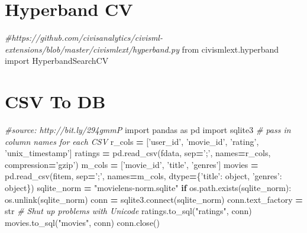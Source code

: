 \documentclass[]{book}
\newenvironment{Shaded}{\begin{snugshade}}{\end{snugshade}}
\newcommand{\StringTok}[1]{\textcolor[rgb]{0.31,0.60,0.02}{#1}}
\newcommand{\ImportTok}[1]{#1}
\newcommand{\CommentTok}[1]{\textcolor[rgb]{0.56,0.35,0.01}{\textit{#1}}}
\newcommand{\ControlFlowTok}[1]{\textcolor[rgb]{0.13,0.29,0.53}{\textbf{#1}}}
\newcommand{\OperatorTok}[1]{\textcolor[rgb]{0.81,0.36,0.00}{\textbf{#1}}}
\newcommand{\BuiltInTok}[1]{#1}
\newcommand{\ExtensionTok}[1]{#1}
\newcommand{\NormalTok}[1]{#1}
\begin{document}
\section{Hyperband CV}\label{hyperband-cv}

\begin{Shaded}
\begin{Highlighting}[]
\CommentTok{#https://github.com/civisanalytics/civisml-extensions/blob/master/civismlext/hyperband.py}
\ImportTok{from}\NormalTok{ civismlext.hyperband }\ImportTok{import}\NormalTok{ HyperbandSearchCV}
\end{Highlighting}
\end{Shaded}

\section{CSV To DB}\label{csv-to-db}

\begin{Shaded}
\begin{Highlighting}[]
\CommentTok{#source: http://bit.ly/294gmmP}
\ImportTok{import}\NormalTok{ pandas }\ImportTok{as}\NormalTok{ pd}
\ImportTok{import}\NormalTok{ sqlite3}
\CommentTok{# pass in column names for each CSV}
\NormalTok{r_cols }\OperatorTok{=}\NormalTok{ [}\StringTok{'user_id'}\NormalTok{, }\StringTok{'movie_id'}\NormalTok{, }\StringTok{'rating'}\NormalTok{, }\StringTok{'unix_timestamp'}\NormalTok{]}
\NormalTok{ratings }\OperatorTok{=}\NormalTok{ pd.read_csv(fdata, sep}\OperatorTok{=}\StringTok{';'}\NormalTok{, names}\OperatorTok{=}\NormalTok{r_cols, compression}\OperatorTok{=}\StringTok{'gzip'}\NormalTok{)}
\NormalTok{m_cols }\OperatorTok{=}\NormalTok{ [}\StringTok{'movie_id'}\NormalTok{, }\StringTok{'title'}\NormalTok{, }\StringTok{'genres'}\NormalTok{]}
\NormalTok{movies }\OperatorTok{=}\NormalTok{ pd.read_csv(fitem, sep}\OperatorTok{=}\StringTok{';'}\NormalTok{, names}\OperatorTok{=}\NormalTok{m_cols, dtype}\OperatorTok{=}\NormalTok{\{}\StringTok{'title'}\NormalTok{: }\BuiltInTok{object}\NormalTok{, }\StringTok{'genres'}\NormalTok{: }\BuiltInTok{object}\NormalTok{\})}
\NormalTok{sqlite_norm }\OperatorTok{=} \StringTok{"movielens-norm.sqlite"}
\ControlFlowTok{if}\NormalTok{ os.path.exists(sqlite_norm):}
\NormalTok{    os.unlink(sqlite_norm)}
\NormalTok{conn }\OperatorTok{=}\NormalTok{ sqlite3.}\ExtensionTok{connect}\NormalTok{(sqlite_norm)}
\NormalTok{conn.text_factory }\OperatorTok{=} \BuiltInTok{str}   \CommentTok{# Shut up problems with Unicode}
\NormalTok{ratings.to_sql(}\StringTok{"ratings"}\NormalTok{, conn)}
\NormalTok{movies.to_sql(}\StringTok{"movies"}\NormalTok{, conn)}
\NormalTok{conn.close()}
\end{Highlighting}
\end{Shaded}
\end{document}
